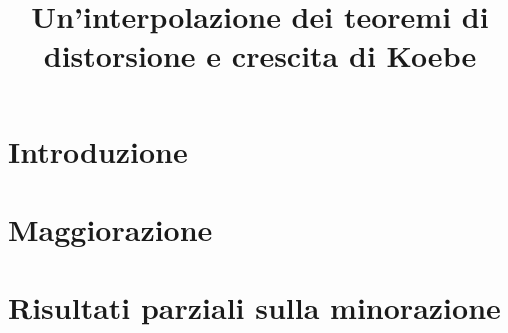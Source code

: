 \documentclass{article}
\title{Un'interpolazione dei teoremi di distorsione e crescita di Koebe}
\author{}
\date{}
\begin{document}
\maketitle
\newpage
\tableofcontents
\newpage


\section*{Introduzione}


\newpage

\section{Maggiorazione}


\newpage

\section{Risultati parziali sulla minorazione}


\newpage


\end{document}
